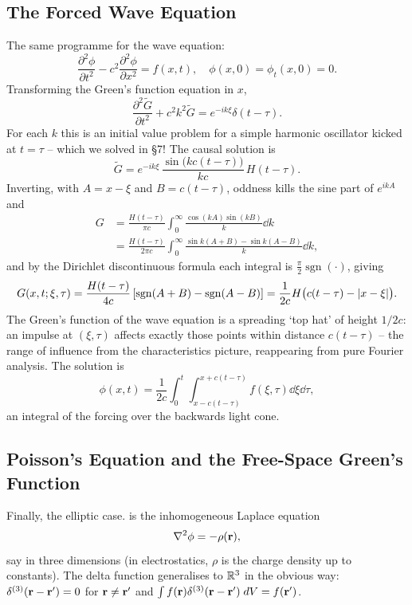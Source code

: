 \documentclass[a4paper]{scrartcl}
\newcommand{\sgn}{\operatorname{sgn}}
\begin{document}
\subsection{The Forced Wave Equation}

The same programme for the wave equation:
$$
\frac{\partial^2 \phi}{\partial t^2} - c^2 \frac{\partial^2 \phi}{\partial x^2} = f(x, t), \quad \phi(x, 0) = \phi_t(x, 0) = 0.
$$
Transforming the Green's function equation in $x$,
$$
\frac{\partial^2 \tilde{G}}{\partial t^2} + c^2 k^2 \tilde{G} = e^{-ik\xi} \delta(t - \tau).
$$
For each $k$ this is an initial value problem for a simple harmonic oscillator kicked at $t = \tau$ -- which we solved in \S 7! The causal solution is
$$
\tilde{G} = e^{-ik \xi}\, \frac{\sin \big(kc(t - \tau)\big)}{kc}\, H(t - \tau).
$$
Inverting, with $A = x - \xi$ and $B = c(t - \tau)$, oddness kills the sine part of $e^{ikA}$ and
\begin{align*}
G &= \frac{H(t - \tau)}{\pi c} \int_0^{\infty} \frac{\cos (kA) \sin (kB)}{k} \dd k \\
&= \frac{H(t - \tau)}{2\pi c}\int_0^{\infty} \frac{\sin k(A + B) - \sin k (A - B)}{k} \dd k,
\end{align*}
and by the Dirichlet discontinuous formula each integral is $\frac{\pi}{2}\sgn(\cdot)$, giving
$$
G(x, t; \xi, \tau) = \frac{H(t - \tau)}{4c}\left[\sgn(A + B) - \sgn(A - B)\right] = \frac{1}{2c} H\big(c(t - \tau) - \abs{x - \xi}\big).
$$
The Green's function of the wave equation is a spreading `top hat' of height $1/2c$: an impulse at $(\xi, \tau)$ affects exactly those points within distance $c(t - \tau)$ -- the range of influence from the characteristics picture, reappearing from pure Fourier analysis. The solution is
$$
\phi(x, t) = \frac{1}{2c}\int_0^t \int_{x - c(t - \tau)}^{x + c(t - \tau)} f(\xi, \tau) \dd \xi \dd \tau,
$$
an integral of the forcing over the backwards light cone.

\subsection{Poisson's Equation and the Free-Space Green's Function}

Finally, the elliptic case.  is the inhomogeneous Laplace equation
$$
\nabla^2 \phi = -\rho(\mathbf{r}),
$$
say in three dimensions (in electrostatics, $\rho$ is the charge density up to constants). The delta function generalises to $\mathbb{R}^3$ in the obvious way: $\delta^{(3)}(\mathbf{r} - \mathbf{r}') = 0$ for $\mathbf{r} \neq \mathbf{r}'$ and $\int f(\mathbf{r}) \delta^{(3)}(\mathbf{r} - \mathbf{r}')\; d V = f(\mathbf{r}')$.
\end{document}
